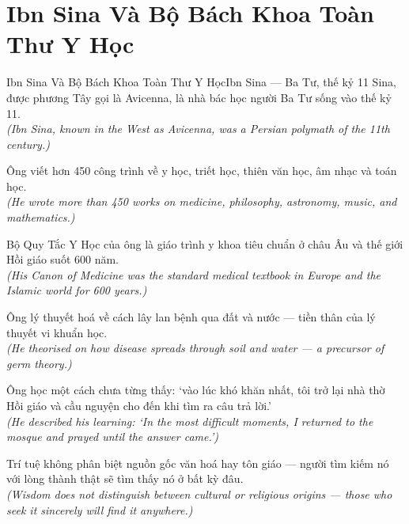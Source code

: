 \section{Ibn Sina Và Bộ Bách Khoa Toàn Thư Y Học}
\begin{truyen}{Ibn Sina Và Bộ Bách Khoa Toàn Thư Y Học}{Ibn Sina --- Ba Tư, thế kỷ 11}
 Sina, được phương Tây gọi là Avicenna, là nhà bác học người Ba Tư sống vào thế kỷ 11.\\[4pt]
\textit{(Ibn Sina, known in the West as Avicenna, was a Persian polymath of the 11th century.)}

Ông viết hơn 450 công trình về y học, triết học, thiên văn học, âm nhạc và toán học.\\[4pt]
\textit{(He wrote more than 450 works on medicine, philosophy, astronomy, music, and mathematics.)}

Bộ Quy Tắc Y Học của ông là giáo trình y khoa tiêu chuẩn ở châu Âu và thế giới Hồi giáo suốt 600 năm.\\[4pt]
\textit{(His Canon of Medicine was the standard medical textbook in Europe and the Islamic world for 600 years.)}

Ông lý thuyết hoá về cách lây lan bệnh qua đất và nước --- tiền thân của lý thuyết vi khuẩn học.\\[4pt]
\textit{(He theorised on how disease spreads through soil and water --- a precursor of germ theory.)}

Ông học một cách chưa từng thấy: `vào lúc khó khăn nhất, tôi trở lại nhà thờ Hồi giáo và cầu nguyện cho đến khi tìm ra câu trả lời.'\\[4pt]
\textit{(He described his learning: `In the most difficult moments, I returned to the mosque and prayed until the answer came.')}

\end{truyen}
\begin{baihoc}
  Trí tuệ không phân biệt nguồn gốc văn hoá hay tôn giáo --- người tìm kiếm nó với lòng thành thật sẽ tìm thấy nó ở bất kỳ đâu.\\[4pt]
  \textit{(Wisdom does not distinguish between cultural or religious origins --- those who seek it sincerely will find it anywhere.)}
\end{baihoc}

